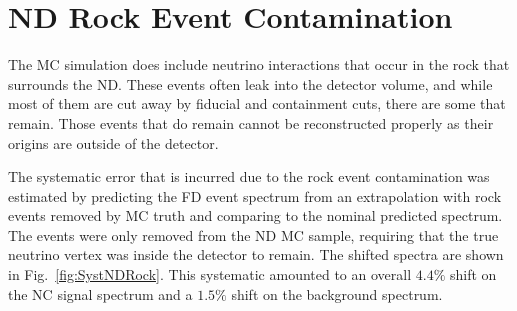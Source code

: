 \section{ND Rock Event Contamination}

The MC simulation does include neutrino interactions that occur in the rock that surrounds the ND. These events often leak into the detector volume, and while most of them are cut away by fiducial and containment cuts, there are some that remain. Those events that do remain cannot be reconstructed properly as their origins are outside of the detector. 

The systematic error that is incurred due to the rock event contamination was estimated by predicting the FD event spectrum from an extrapolation with rock events removed by MC truth and comparing to the nominal predicted spectrum. The events were only removed from the ND MC sample, requiring that the true neutrino vertex was inside the detector to remain. The shifted spectra are shown in Fig.~\ref{fig:SystNDRock}. This systematic amounted to an overall $4.4\%$ shift on the NC signal spectrum and a $1.5\%$ shift on the background spectrum.

